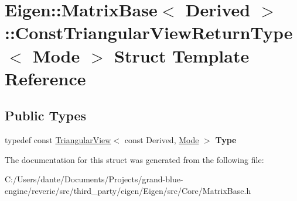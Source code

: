 \hypertarget{struct_eigen_1_1_matrix_base_1_1_const_triangular_view_return_type}{}\section{Eigen\+::Matrix\+Base$<$ Derived $>$\+::Const\+Triangular\+View\+Return\+Type$<$ Mode $>$ Struct Template Reference}
\label{struct_eigen_1_1_matrix_base_1_1_const_triangular_view_return_type}
\subsection*{Public Types}
\begin{DoxyCompactItemize}
\item 
\mbox{\label{struct_eigen_1_1_matrix_base_1_1_const_triangular_view_return_type_a40f14663a6e3112a6d9829ba37c7e30d}} 
typedef const \mbox{\hyperlink{class_eigen_1_1_triangular_view}{Triangular\+View}}$<$ const Derived, \mbox{\hyperlink{struct_mode}{Mode}} $>$ {\bfseries Type}
\end{DoxyCompactItemize}


The documentation for this struct was generated from the following file\+:\begin{DoxyCompactItemize}
\item 
C\+:/\+Users/dante/\+Documents/\+Projects/grand-\/blue-\/engine/reverie/src/third\+\_\+party/eigen/\+Eigen/src/\+Core/Matrix\+Base.\+h\end{DoxyCompactItemize}
